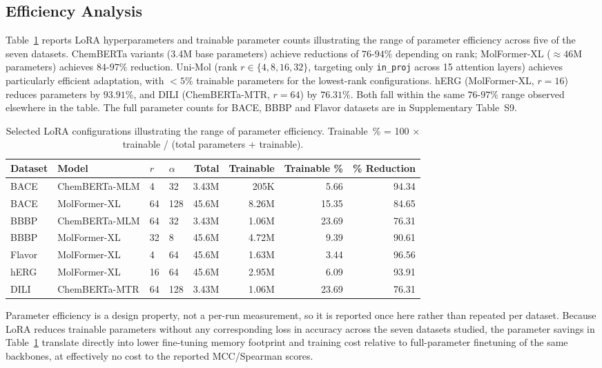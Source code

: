 \documentclass[pdflatex,sn-mathphys-num]{sn-jnl}%
\begin{document}
\subsection{Efficiency Analysis}\label{sec:efficiency}
Table~\ref{tab:params} reports LoRA hyperparameters and trainable parameter counts illustrating the range of parameter efficiency across five of the seven datasets. ChemBERTa variants (3.4M base parameters) achieve reductions of $76$-$94\%$ depending on rank; MolFormer-XL ($\approx 46$M parameters) achieves $84$-$97\%$ reduction. Uni-Mol (rank $r \in \{4,8,16,32\}$, targeting only \texttt{in\_proj} across 15 attention layers) achieves particularly efficient adaptation, with $<5\%$ trainable parameters for the lowest-rank configurations. hERG (MolFormer-XL, $r=16$) reduces parameters by $93.91\%$, and DILI (ChemBERTa-MTR, $r=64$) by $76.31\%$. Both fall within the same $76$-$97\%$ range observed elsewhere in the table. The full parameter counts for BACE, BBBP and Flavor datasets are in Supplementary Table~S9.

\begin{table}[!ht]
\centering
\caption{Selected LoRA configurations illustrating the range of parameter efficiency. Trainable~\% = 100 $\times$ trainable / (total parameters + trainable).}
\label{tab:params}
\begin{tabular}{llllrrrr}
\toprule
Dataset & Model & $r$ & $\alpha$ & Total & Trainable & Trainable \% & \% Reduction \\
\midrule
BACE   & ChemBERTa-MLM & 4  & 32  & 3.43M & 205K  & 5.66  & 94.34 \\
BACE   & MolFormer-XL  & 64 & 128 & 45.6M & 8.26M & 15.35 & 84.65 \\
BBBP   & ChemBERTa-MLM & 64 & 32  & 3.43M & 1.06M & 23.69 & 76.31 \\
BBBP   & MolFormer-XL  & 32 & 8   & 45.6M & 4.72M & 9.39  & 90.61 \\
Flavor & MolFormer-XL  & 4  & 64  & 45.6M & 1.63M & 3.44  & 96.56 \\
hERG   & MolFormer-XL  & 16 & 64  & 45.6M & 2.95M & 6.09  & 93.91 \\
DILI   & ChemBERTa-MTR & 64 & 128 & 3.43M & 1.06M & 23.69 & 76.31 \\
\bottomrule
\end{tabular}
\end{table}

Parameter efficiency is a design property, not a per-run measurement, so it is reported once here rather than repeated per dataset. Because LoRA reduces trainable parameters without any corresponding loss in accuracy across the seven datasets studied, the parameter savings in Table~\ref{tab:params} translate directly into lower fine-tuning memory footprint and training cost relative to full-parameter finetuning of the same backbones, at effectively no cost to the reported MCC/Spearman scores.
\end{document}
